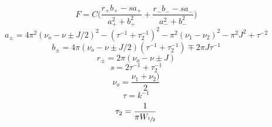 \documentclass{article}
\begin{document}
\begin{equation}
F = C\bigg(\frac{r_+b_+-sa_+}{a_+^2+b_+^2}+\frac{r_-b_--sa_-}{a_-^2+b_-^2}\bigg)
\end{equation}
\begin{equation}
a_\pm = 4\pi^2(\nu_o-\nu\pm J/2)^2-(\tau^{-1}+\tau_2^{-1})^2-\pi^2(\nu_1-\nu_2)^2-\pi^2 J^2 + \tau^{-2}
\end{equation}
\begin{equation}
b_\pm = 4\pi(\nu_o-\nu\pm J/2)(\tau^{-1}+\tau_2^{-1})\mp 2\pi J\tau^{-1}
\end{equation}
\begin{equation}
r_\pm = 2\pi(\nu_o-\nu\pm J)
\end{equation}
\begin{equation}
s = 2\tau^{-1}+\tau_2^{-1}
\end{equation}
\begin{equation}
\nu_o = \frac{\nu_1 + \nu_2)}{2}
\end{equation}
\begin{equation}
\tau = k^{-1}
\end{equation}
\begin{equation}
\tau_2 = \frac{1}{\pi W_{\sfrac{1}{2}}}
\end{equation}
\end{document}

